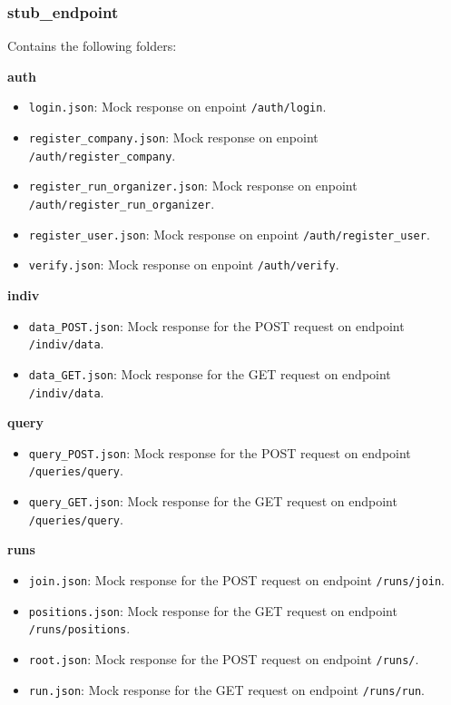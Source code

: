 \subsubsection{stub\_endpoint}
Contains the following folders: 

\noindent \textbf{auth}
\begin{itemize}
    \item \texttt{login.json}: Mock response on enpoint \texttt{/auth/login}.
    \item \texttt{register\_company.json}: Mock response on enpoint \texttt{/auth/register\_company}.
    \item \texttt{register\_run\_organizer.json}: Mock response on enpoint \texttt{/auth/register\_run\_organizer}.
    \item \texttt{register\_user.json}: Mock response on enpoint \texttt{/auth/register\_user}.
    \item \texttt{verify.json}: Mock response on enpoint \texttt{/auth/verify}.

\end{itemize}

\noindent \textbf{indiv}
\begin{itemize}
    \item \texttt{data\_POST.json}: Mock response for the POST request on endpoint \texttt{/indiv/data}.
    \item \texttt{data\_GET.json}: Mock response for the GET request on endpoint \texttt{/indiv/data}.
\end{itemize}

\noindent \textbf{query}
\begin{itemize}
    \item \texttt{query\_POST.json}: Mock response for the POST request on endpoint \texttt{/queries/query}.
    \item \texttt{query\_GET.json}: Mock response for the GET request on endpoint \texttt{/queries/query}.
\end{itemize}


\noindent \textbf{runs}
\begin{itemize}
    \item \texttt{join.json}: Mock response for the POST request on endpoint \texttt{/runs/join}.
    \item \texttt{positions.json}: Mock response for the GET request on endpoint \texttt{/runs/positions}.
     \item \texttt{root.json}: Mock response for the POST request on endpoint \texttt{/runs/}.
    \item \texttt{run.json}: Mock response for the GET request on endpoint \texttt{/runs/run}.
\end{itemize}

